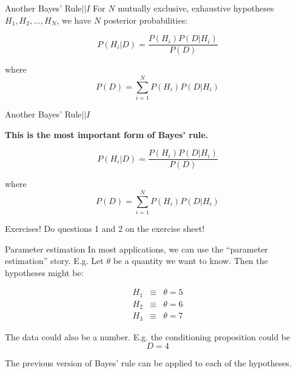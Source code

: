 \documentclass{beamer}
\begin{document}
\begin{frame}[t]{Another Bayes' Rule\hspace{170pt}$|| I$}
For $N$ mutually exclusive, exhaustive hypotheses
$H_1, H_2, ..., H_N$, we have $N$ posterior probabilities:

\begin{equation}
P(H_i | D) = \frac{P(H_i)P(D|H_i)}{P(D)}
\end{equation}

where
\begin{equation}
P(D) = \sum_{i=1}^N P(H_i)P(D|H_i)
\end{equation}
\end{frame}

\begin{frame}[t]{Another Bayes' Rule\hspace{170pt}$|| I$}

{\bf This is the most important form of Bayes' rule.}

\begin{equation}
P(H_i | D) = \frac{P(H_i)P(D|H_i)}{P(D)}
\end{equation}

where
\begin{equation}
P(D) = \sum_{i=1}^N P(H_i)P(D|H_i)
\end{equation}
\end{frame}


\begin{frame}[t]{Exercises!}
Do questions 1 and 2 on the exercise sheet!
\end{frame}

\begin{frame}[t]{Parameter estimation}
In most applications, we can use the ``parameter estimation'' story. E.g.
Let $\theta$ be a quantity we want to know. Then the hypotheses might be:

\begin{eqnarray}
H_1 &\equiv& \theta = 5\\
H_2 &\equiv& \theta = 6\\
H_3 &\equiv& \theta = 7
\end{eqnarray}

The data could also be a number. E.g. the conditioning proposition could be
\begin{equation}
D = 4
\end{equation}

The previous version of Bayes' rule can be applied to each of the
hypotheses.
\end{frame}
\end{document}
